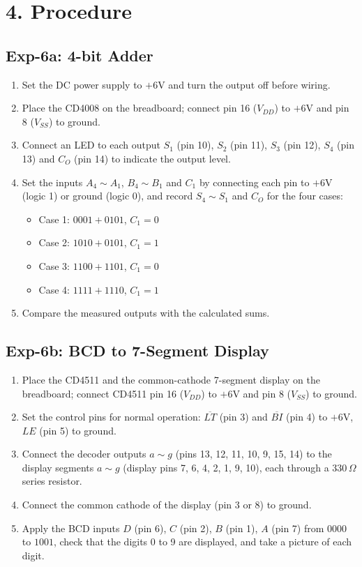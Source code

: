 \section*{4. Procedure}
\subsection*{Exp-6a: 4-bit Adder}
\begin{enumerate}[leftmargin=*]
    \item Set the DC power supply to $+6\text{V}$ and turn the output off before wiring.
    \item Place the CD4008 on the breadboard; connect pin 16 ($V_{DD}$) to $+6\text{V}$ and pin 8 ($V_{SS}$) to ground.
    \item Connect an LED to each output $S_1$ (pin 10), $S_2$ (pin 11), $S_3$ (pin 12), $S_4$ (pin 13) and $C_O$ (pin 14) to indicate the output level.
    \item Set the inputs $A_4 \sim A_1$, $B_4 \sim B_1$ and $C_1$ by connecting each pin to $+6\text{V}$ (logic 1) or ground (logic 0), and record $S_4 \sim S_1$ and $C_O$ for the four cases:
    \begin{itemize}
        \item Case 1: $0001 + 0101$, $C_1 = 0$
        \item Case 2: $1010 + 0101$, $C_1 = 1$
        \item Case 3: $1100 + 1101$, $C_1 = 0$
        \item Case 4: $1111 + 1110$, $C_1 = 1$
    \end{itemize}
    \item Compare the measured outputs with the calculated sums.
\end{enumerate}

\subsection*{Exp-6b: BCD to 7-Segment Display}
\begin{enumerate}[leftmargin=*]
    \item Place the CD4511 and the common-cathode 7-segment display on the breadboard; connect CD4511 pin 16 ($V_{DD}$) to $+6\text{V}$ and pin 8 ($V_{SS}$) to ground.
    \item Set the control pins for normal operation: $\overline{LT}$ (pin 3) and $\overline{BI}$ (pin 4) to $+6\text{V}$, $LE$ (pin 5) to ground.
    \item Connect the decoder outputs $a \sim g$ (pins 13, 12, 11, 10, 9, 15, 14) to the display segments $a \sim g$ (display pins 7, 6, 4, 2, 1, 9, 10), each through a $330\,\Omega$ series resistor.
    \item Connect the common cathode of the display (pin 3 or 8) to ground.
    \item Apply the BCD inputs $D$ (pin 6), $C$ (pin 2), $B$ (pin 1), $A$ (pin 7) from $0000$ to $1001$, check that the digits 0 to 9 are displayed, and take a picture of each digit.
\end{enumerate}

\newpage
